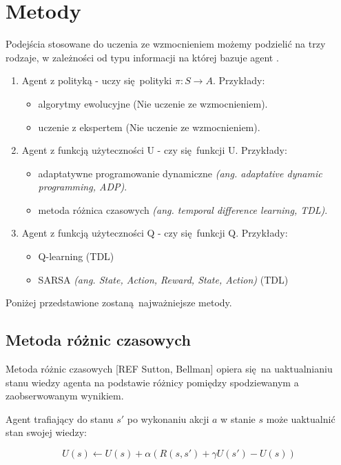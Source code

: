 \section{Metody}\label{methods}

Podejścia stosowane do uczenia ze wzmocnieniem możemy podzielić na trzy rodzaje, w zależności od typu informacji na której bazuje agent \cite{wjaskowski2016}.

\begin{enumerate}
\item Agent z polityką - uczy się polityki  $\pi: S \rightarrow A$. Przykłady:
\begin{itemize}
\item algorytmy ewolucyjne (Nie uczenie ze wzmocnieniem).
\item uczenie z ekspertem (Nie uczenie ze wzmocnieniem).
\end{itemize}
\item Agent z funkcją użyteczności U - czy się funkcji U. Przykłady:
\begin{itemize}
\item adaptatywne programowanie dynamiczne \textit{(ang. adaptative dynamic programming, ADP)}.
\item metoda różnica czasowych \textit{(ang. temporal difference learning, TDL)}.
\end{itemize}
\item Agent z funkcją użyteczności Q - czy się funkcji Q. Przykłady:
\begin{itemize}
\item Q-learning (TDL)
\item SARSA \textit{(ang. State, Action, Reward, State, Action)} (TDL)
\end{itemize}
\end{enumerate}

Poniżej przedstawione zostaną najważniejsze metody.

\subsection{Metoda różnic czasowych}

Metoda różnic czasowych [REF Sutton, Bellman] opiera się na uaktualnianiu stanu wiedzy agenta na podstawie różnicy pomiędzy spodziewanym a zaobserwowanym wynikiem.

Agent trafiający do stanu $s'$ po wykonaniu akcji $a$ w stanie $s$ może uaktualnić stan swojej wiedzy:

$$U(s) \leftarrow U(s) + \alpha (R(s,s') + \gamma U(s') - U (s))$$

